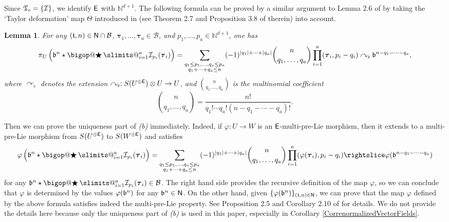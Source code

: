 \documentclass[10pt, reqno]{amsart}
\makeatletter
\numberwithin{subsection}{section}
\numberwithin{subsubsection}{subsection}
\numberwithin{equation}{section} %
\theoremstyle{mystyle}
\newtheorem{lem}[thm]{\hspace{-0.14cm}  {Lemma} }%
\theoremstyle{mystyle2}
\theoremstyle{mystyle3}
\DeclareRobustCommand\bigop[1]{%
  \mathop{\vphantom{\sum}\mathpalette\bigop@{#1}}\slimits@
}
\newcommand{\bigop@}[2]{%
  \vcenter{%
    \sbox\z@{$#1\sum$}%
    \hbox{\resizebox{\ifx#1\displaystyle.9\fi\dimexpr\ht\z@+\dp\z@}{!}{$\m@th#2$}}%
  }%
}
\newcommand{\Bigstar}{\DOTSB\bigop{\bigstar}}
\newcommand{\bstau}{\boldsymbol{\tau}}
\newcommand{\ssk}{\smallskip}
\newcommand\bbN{\mathbb{N}}
\newcommand{\mcB}{\mathcal{B}}
\newcommand{\mcI}{\mathcal{I}}
\makeatother
\begin{document}
\ssk

Since $\frak{T}_{\rm e}=\{\mcI\}$, we identify $\sf E$ with $\bbN^{d+1}$. The following formula can be proved by a similar argument to Lemma 2.6 of \cite{FoissyTypedTrees} by taking the `Taylor deformation' map $\Theta$ introduced in \cite{BM23} (see Theorem 2.7 and Proposition 3.8 of therein) into account. 

\medskip

\begin{lem}
For any $(\frak{t},n)\in{\sf N}\cap\mcB$, $\bstau_1,\dots,\bstau_a\in\mcB$, and $p_1,\dots,p_a\in\bbN^{d+1}$, one has
$$
\pi_U\left(\frak{b}^n\star\Bigstar_{i=1}^a \mcI_{p_i}(\bstau_i)\right)
=\sum_{\substack{q_1\le p_1,\dots,q_a\le p_a \\ q_1+\cdots+q_a\le n}}
(-1)^{|q_1|+\cdots+|q_a|}\binom{n}{q_1,\dots,q_a}
\prod_{i=1}^a (\bstau_i,p_i-q_i)\curvearrowright_\flat \frak{b}^{n-q_1-\cdots-q_a},
$$
where $\curvearrowright_\flat$ denotes the extension $\curvearrowright_\flat : S(U^{\oplus{\sf E}})\otimes U\to U$, and $\binom{n}{q_1,\dots,q_a}$ 
is the multinomial coefficient
$$
\binom{n}{q_1,\dots,q_a}=\frac{n!}{q_1!\cdots q_a!(n-q_1-\cdots-q_a)!}.
$$
\end{lem}

\medskip

Then we can prove the uniqueness part of \textit{\textsf{(b)}} immediately. Indeed, if $\varphi:U\to W$ is an $\sf E$-multi-pre-Lie morphism, then it extends to a multi-pre-Lie morphism from $S(U^{\oplus{\sf E}})$ to $S(W^{\oplus{\sf E}})$ and satisfies
$$
\varphi\left(\frak{b}^n\star\Bigstar_{i=1}^a \mcI_{p_i}(\bstau_i)\right)
=\sum_{\substack{q_1\le p_1,\dots,q_a\le p_a \\ q_1+\cdots+q_a\le n}}
(-1)^{|q_1|+\cdots+|q_a|}\binom{n}{q_1,\dots,q_a}
\prod_{i=1}^a (\varphi(\bstau_i),p_i-q_i)\rightslice \varphi(\frak{b}^{n-q_1-\cdots-q_a})
$$
for any $\frak{b}^n\star\Bigstar_{i=1}^a \mcI_{p_i}(\bstau_i)\in\mcB$.
The right hand side provides the recursive definition of the map $\varphi$, so we can conclude that $\varphi$ is determined by the values $\varphi(\frak{b}^n)$ for any $\frak{b}^n\in{\sf N}$. On the other hand, given $\{\varphi(\frak{b}^n)\}_{(\frak{t},n)\in{\sf N}}$, we can prove that the map $\varphi$ defined by the above formula satisfies indeed the multi-pre-Lie property. See Proposition 2.5 and Corollary 2.10 of \cite{BM23} for details.
We do not provide the details here because only the uniqueness part of \textit{\textsf{(b)}} is used in this paper, especially in Corollary \ref{CorrenormalizedVectorFields}.
\end{document}
